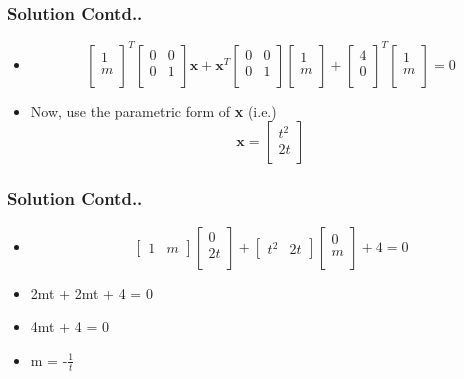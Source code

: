 \documentclass[12pt]{beamer}
\begin{document}
\begin{frame}
\frametitle{Solution Contd..}
\begin{itemize}
\item
\[
\begin{bmatrix}
    1\\
    m\\  
\end{bmatrix}^T
\begin{bmatrix}
    0 & 0\\
    0 & 1\\  
\end{bmatrix}
\textbf{x} + 
\textbf{x}^T
\begin{bmatrix}
    0 & 0\\
    0 & 1\\  
\end{bmatrix}
\begin{bmatrix}
    1\\
    m\\  
\end{bmatrix} + 
\begin{bmatrix}
    4\\
    0\\  
\end{bmatrix}^T
\begin{bmatrix}
    1\\
    m\\  
\end{bmatrix} = 0
\]
\item Now, use the parametric form of \textbf{x} (i.e.)
\[
\textbf{x} = 
\begin{bmatrix}
    t^2\\
    2t\\  
\end{bmatrix}
\]
\end{itemize}
\end{frame}



\begin{frame}
\frametitle{Solution Contd..}
\begin{itemize}
\item
\[
\begin{bmatrix}
    1 & m  
\end{bmatrix}
\begin{bmatrix}
    0\\
    2t\\  
\end{bmatrix} + 
\begin{bmatrix}
    t^2 & 2t  
\end{bmatrix}
\begin{bmatrix}
    0\\
    m\\  
\end{bmatrix} + 4 = 0
\]
\item 2mt + 2mt + 4 = 0
\item 4mt + 4 = 0
\item m = -$\frac{1}{t}$
\end{itemize}
\end{frame}
\end{document}
